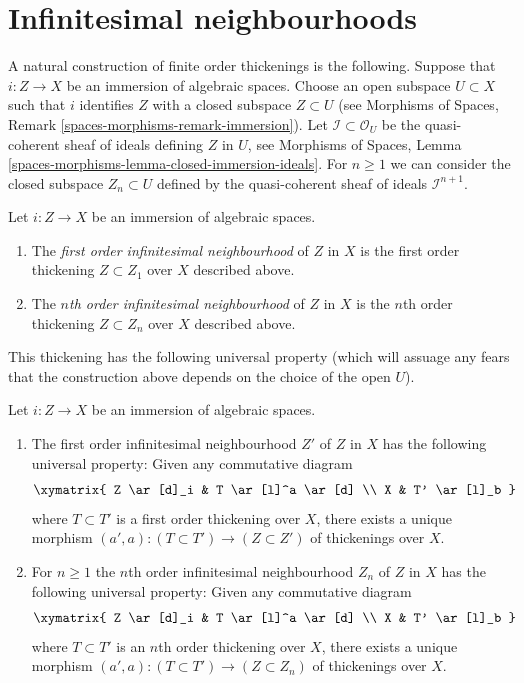 \section{Infinitesimal neighbourhoods}
\label{section-first-order-infinitesimal-neighbourhood}

\noindent
A natural construction of finite order thickenings is the following.
Suppose that $i : Z \to X$ be an immersion of algebraic spaces. Choose an
open subspace $U \subset X$ such that $i$ identifies $Z$ with a closed
subspace $Z \subset U$ (see
Morphisms of Spaces, Remark \ref{spaces-morphisms-remark-immersion}).
Let $\mathcal{I} \subset \mathcal{O}_U$ be the
quasi-coherent sheaf of ideals defining $Z$ in $U$, see
Morphisms of Spaces,
Lemma \ref{spaces-morphisms-lemma-closed-immersion-ideals}.
For $n \geq 1$ we can consider the closed subspace $Z_n \subset U$
defined by the quasi-coherent sheaf of ideals $\mathcal{I}^{n + 1}$.

\begin{definition}
\label{definition-first-order-infinitesimal-neighbourhood}
Let $i : Z \to X$ be an immersion of algebraic spaces.
\begin{enumerate}
\item The {\it first order infinitesimal neighbourhood} of $Z$ in $X$ is
the first order thickening $Z \subset Z_1$ over $X$ described above.
\item The {\it $n$th order infinitesimal neighbourhood} of $Z$ in $X$ is
the $n$th order thickening $Z \subset Z_n$ over $X$ described above.
\end{enumerate}
\end{definition}

\noindent
This thickening has the following universal property (which will assuage
any fears that the construction above depends on the choice of the open
$U$).

\begin{lemma}
\label{lemma-first-order-infinitesimal-neighbourhood}
Let $i : Z \to X$ be an immersion of algebraic spaces.
\begin{enumerate}
\item The first order infinitesimal neighbourhood $Z'$ of $Z$ in $X$
has the following universal property:
Given any commutative diagram
$$
\xymatrix{
Z \ar[d]_i & T \ar[l]^a \ar[d] \\
X & T' \ar[l]_b
}
$$
where $T \subset T'$ is a first order thickening over $X$, there exists
a unique morphism $(a', a) : (T \subset T') \to (Z \subset Z')$ of
thickenings over $X$.
\item For $n \geq 1$ the $n$th order infinitesimal neighbourhood
$Z_n$ of $Z$ in $X$ has the following universal property:
Given any commutative diagram
$$
\xymatrix{
Z \ar[d]_i & T \ar[l]^a \ar[d] \\
X & T' \ar[l]_b
}
$$
where $T \subset T'$ is an $n$th order thickening over $X$, there exists
a unique morphism $(a', a) : (T \subset T') \to (Z \subset Z_n)$ of
thickenings over $X$.
\end{enumerate}
\end{lemma}

